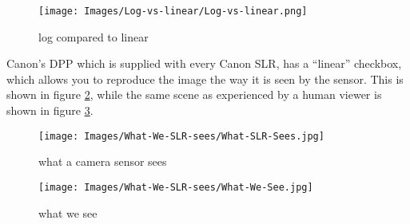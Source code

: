 \begin{figure}[htbp]
	\centering
		\texttt{[image: Images/Log-vs-linear/Log-vs-linear.png]}
	\caption{log compared to linear}
	\label{fig:Log-vs-linear}
\end{figure}


Canon's \gls{DPP} which is supplied with every Canon \gls{SLR}, has a ``linear'' checkbox, which allows you to reproduce the image the way it is seen by the sensor. This is shown in figure \ref{fig:What-SLR-Sees}, while the same scene as experienced by a human viewer is shown in figure \ref{fig:What-We-See}.

\begin{figure}[htb]
	\centering
		\texttt{[image: Images/What-We-SLR-sees/What-SLR-Sees.jpg]}
	\caption{what a camera sensor sees}
	\label{fig:What-SLR-Sees}
\end{figure}

\begin{figure}[htb]
	\centering
		\texttt{[image: Images/What-We-SLR-sees/What-We-See.jpg]}
	\caption{what we see}
	\label{fig:What-We-See}
\end{figure}

